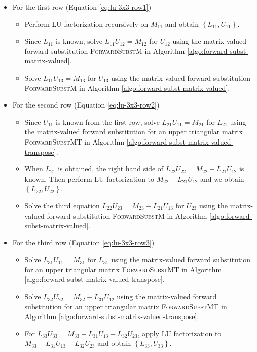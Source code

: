 \documentclass[11pt, a4paper]{book}
\begin{document}
\begin{itemize}
\item For the first row (Equation \eqref{eq:lu-3x3-row1})
  \begin{itemize}
  \item Perform LU factorization recursively on $M_{11}$ and obtain $\left\{ L_{11}, U_{11} \right\}$.
  \item Since $L_{11}$ is known, solve $L_{11}U_{12} = M_{12}$ for $U_{12}$ using the
    matrix-valued forward substitution \textsc{ForwardSubstM} in Algorithm
    \ref{algo:forward-subst-matrix-valued}.
  \item Solve $L_{11}U_{13} = M_{13}$ for $U_{13}$ using the matrix-valued forward
    substitution \textsc{ForwardSubstM} in Algorithm
    \ref{algo:forward-subst-matrix-valued}.
  \end{itemize}
\item For the second row (Equation \eqref{eq:lu-3x3-row2})
  \begin{itemize}
  \item Since $U_{11}$ is known from the first row, solve $L_{21}U_{11} = M_{21}$ for
    $L_{21}$ using the matrix-valued forward substitution for an upper triangular matrix
    \textsc{ForwardSubstMT} in Algorithm \ref{algo:forward-subst-matrix-valued-transpose}.
  \item When $L_{21}$ is obtained, the right hand side of
    $L_{22}U_{22} = M_{22} - L_{21}U_{12}$ is known. Then perform LU factorization to
    $M_{22} - L_{21}U_{12}$ and we obtain $\left\{ L_{22}, U_{22} \right\}$.
  \item Solve the third equation $L_{22}U_{23} = M_{23} - L_{21}U_{13}$ for $U_{23}$ using
    the matrix-valued forward substitution \textsc{ForwardSubstM} in Algorithm
    \ref{algo:forward-subst-matrix-valued}.
  \end{itemize}
\item For the third row (Equation \eqref{eq:lu-3x3-row3})
  \begin{itemize}
  \item Solve $L_{31}U_{11} = M_{31}$ for $L_{31}$ using the matrix-valued forward
    substitution for an upper triangular matrix \textsc{ForwardSubstMT} in Algorithm
    \ref{algo:forward-subst-matrix-valued-transpose}.
  \item Solve $L_{32}U_{22} = M_{32} - L_{31}U_{12}$ using the matrix-valued forward
    substitution for an upper triangular matrix \textsc{ForwardSubstMT} in Algorithm
    \ref{algo:forward-subst-matrix-valued-transpose}.
  \item For $L_{33}U_{33} = M_{33} - L_{31}U_{13} - L_{32}U_{23}$, apply LU factorization
    to $M_{33} - L_{31}U_{13} - L_{32}U_{23}$ and obtain
    $\left\{ L_{33}, U_{33} \right\}$.
  \end{itemize}
\end{itemize}
\end{document}
